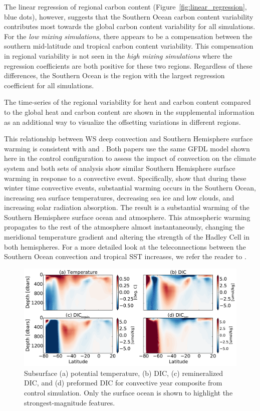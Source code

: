 The linear regression of regional carbon content
(Figure~\ref{fig:linear_regression}, blue dots), however, suggests that the
Southern Ocean carbon content variability contributes most towards the global
carbon content variability for all simulations. For the \textit{low mixing simulations},
there appears to be a compensation between the southern mid-latitude and tropical
carbon content variability. This compensation in regional variability is not seen
in the \textit{high mixing simulations} where the regression coefficients are both
positive for these two regions. Regardless of these differences, the Southern
Ocean is the region with the largest regression coefficient for all simulations.

The time-series of the regional variability for heat and carbon content compared
to the global heat and carbon content are shown in the supplemental information
as an additional way to visualize the offsetting variations in different regions.

This relationship between WS deep convection and Southern
Hemisphere surface warming is consistent with \citet{Bernardello2014} and
\citet{Cabre}. Both papers use the same GFDL model shown here in the control configuration to assess the
impact of convection on the climate system and both sets of analysis show
similar Southern Hemisphere surface warming in response to a convective event.
Specifically, \citet{Cabre} show that during these winter time convective events,
substantial warming occurs in the Southern Ocean, increasing sea surface
temperatures, decreasing sea ice and low clouds, and increasing solar radiation
absorption. The result is a substantial warming of the Southern Hemisphere surface
ocean and atmosphere. This atmospheric warming propagates to the rest of the
atmosphere almost instantaneously, changing the meridional temperature gradient
and altering the strength of the Hadley Cell in both hemispheres. For a more
detailed look at the teleconnections between the Southern Ocean convection and
tropical SST increases, we refer the reader to \citet{Cabre}.


\begin{figure}
\noindent
\centering
\includegraphics[width=33pc]{figure8.pdf}
\caption{Subsurface (a) potential temperature, (b) DIC, (c) remineralized DIC, and (d) preformed
DIC for convective year composite from control simulation. Only the surface ocean
is shown to highlight the strongest-magnitude features.}
\label{fig:subsurface}
\end{figure}



